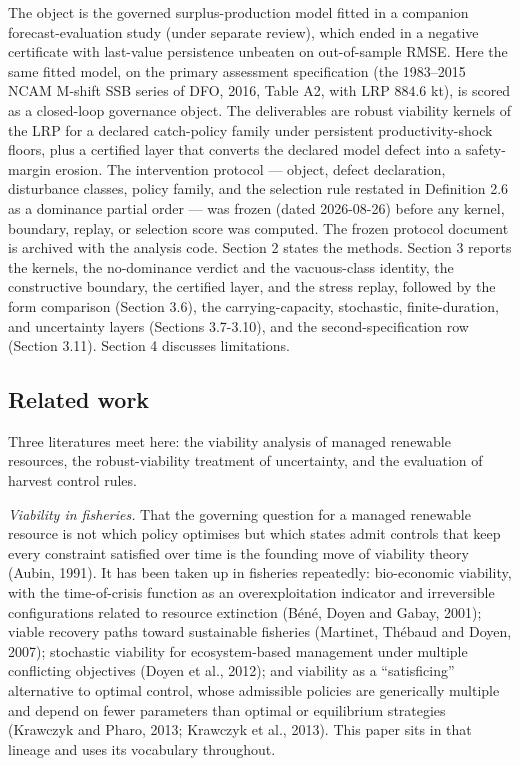 The object is the governed surplus-production model fitted in a
companion forecast-evaluation study (under separate review), which ended
in a negative certificate with last-value persistence unbeaten on
out-of-sample RMSE. Here the same fitted model, on the primary
assessment specification (the 1983--2015 NCAM M-shift SSB series of DFO,
2016, Table A2, with LRP \(884.6\) kt), is scored as a closed-loop
governance object. The deliverables are robust viability kernels of the
LRP for a declared catch-policy family under persistent
productivity-shock floors, plus a certified layer that converts the
declared model defect into a safety-margin erosion. The intervention
protocol --- object, defect declaration, disturbance classes, policy
family, and the selection rule restated in Definition 2.6 as a dominance
partial order --- was frozen (dated 2026-08-26) before any kernel,
boundary, replay, or selection score was computed. The frozen protocol
document is archived with the analysis code. Section 2 states the
methods. Section 3 reports the kernels, the no-dominance verdict and the
vacuous-class identity, the constructive boundary, the certified layer,
and the stress replay, followed by the form comparison (Section 3.6),
the carrying-capacity, stochastic, finite-duration, and uncertainty
layers (Sections 3.7-3.10), and the second-specification row (Section
3.11). Section 4 discusses limitations.

\subsection{Related work}
\label{budget-priorart}

Three literatures meet here: the viability analysis of managed renewable resources, the
robust-viability treatment of uncertainty, and the evaluation of harvest control rules.

\textit{Viability in fisheries.} That the governing question for a managed renewable resource
is not which policy optimises but which states admit controls that keep every constraint
satisfied over time is the founding move of viability theory (Aubin, 1991). It has been taken
up in fisheries repeatedly: bio-economic viability, with the time-of-crisis function as an
overexploitation indicator and irreversible configurations related to resource extinction
(B\'en\'e, Doyen and Gabay, 2001); viable recovery paths toward sustainable fisheries
(Martinet, Th\'ebaud and Doyen, 2007); stochastic viability for ecosystem-based management
under multiple conflicting objectives (Doyen et al., 2012); and viability as a
``satisficing'' alternative to optimal control, whose admissible policies are generically
multiple and depend on fewer parameters than optimal or equilibrium strategies (Krawczyk and
Pharo, 2013; Krawczyk et al., 2013). This paper sits in that lineage and uses its vocabulary
throughout.

